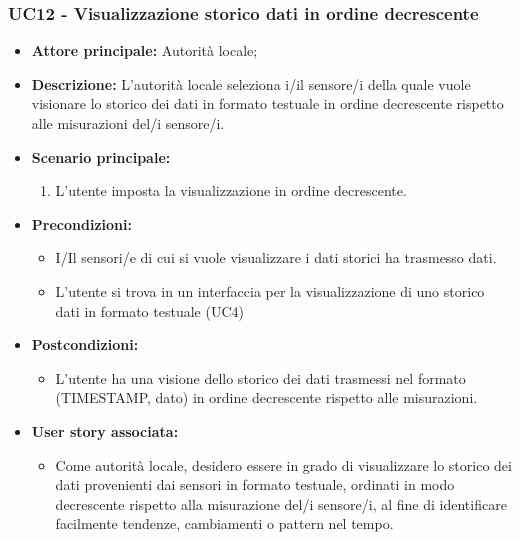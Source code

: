 \documentclass{article}
\begin{document}
\subsubsection{UC12 - Visualizzazione storico dati in ordine decrescente}
\begin{itemize}
    \item \textbf{Attore principale:} Autorità locale;
    \item \textbf{Descrizione:} L’autorità locale seleziona i/il sensore/i della quale vuole visionare lo storico dei dati in formato testuale in ordine decrescente rispetto alle misurazioni del/i sensore/i.
    \item \textbf{Scenario principale:}
          \begin{enumerate}
              \item L'utente imposta la visualizzazione in ordine decrescente.
          \end{enumerate}
    \item \textbf{Precondizioni:}
          \begin{itemize}
              \item  I/Il sensori/e di cui si vuole visualizzare i dati storici ha trasmesso dati.
              \item  L'utente si trova in un interfaccia per la visualizzazione di uno storico dati in formato testuale (UC4)
          \end{itemize}
    \item \textbf{Postcondizioni:}
          \begin{itemize}
              \item  L'utente ha una visione dello storico dei dati trasmessi nel formato (TIMESTAMP, dato) in ordine decrescente rispetto alle misurazioni.
          \end{itemize}
    \item \textbf{User story associata:}
          \begin{itemize}
            \item Come autorità locale, desidero essere in grado di visualizzare lo storico dei dati provenienti dai sensori in formato testuale, ordinati in modo decrescente rispetto alla misurazione del/i sensore/i, al fine di identificare facilmente tendenze, cambiamenti o pattern nel tempo.
          \end{itemize}
\end{itemize}
\end{document}
